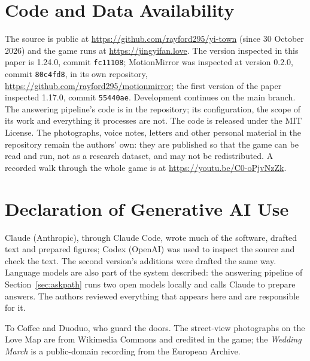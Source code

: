 \documentclass[sigconf,nonacm]{acmart}
\newcommand{\code}[1]{\textnormal{\texttt{\small #1}}}
\begin{document}
\section*{Code and Data Availability}
The source is public at \url{https://github.com/rayford295/yi-town} (since 30 October 2026) and
the game runs at \url{https://jingyifan.love}. The version inspected in this paper is 1.24.0,
commit \code{fc11108}; MotionMirror was inspected at version 0.2.0, commit \code{80c4fd8}, in
its own repository, \url{https://github.com/rayford295/motionmirror}; the first version of the paper inspected 1.17.0, commit \code{55440ae}.
Development continues on the main branch. The answering pipeline's code is in the repository;
its configuration, the scope of its work and everything it processes are not. The code is released under the
MIT License. The photographs, voice notes, letters and other personal material in the repository
remain the authors' own: they are published so that the game can be read and run, not as a
research dataset, and may not be redistributed. A recorded walk through the whole game is at
\url{https://youtu.be/C0-oPjvNzZk}.

\section*{Declaration of Generative AI Use}
Claude (Anthropic), through Claude Code, wrote much of the software, drafted text and prepared
figures; Codex (OpenAI) was used to inspect the source and check the text. The second version's
additions were drafted the same way. Language models are also part of the system described: the
answering pipeline of Section~\ref{sec:askpath} runs two open models locally and calls Claude to
prepare answers. The authors reviewed everything that appears here and are responsible for it.

\begin{acks}
To Coffee and Duoduo, who guard the doors. The street-view photographs on the Love Map are from
Wikimedia Commons and credited in the game; the \emph{Wedding March} is a public-domain recording
from the European Archive.
\end{acks}



\end{document}
